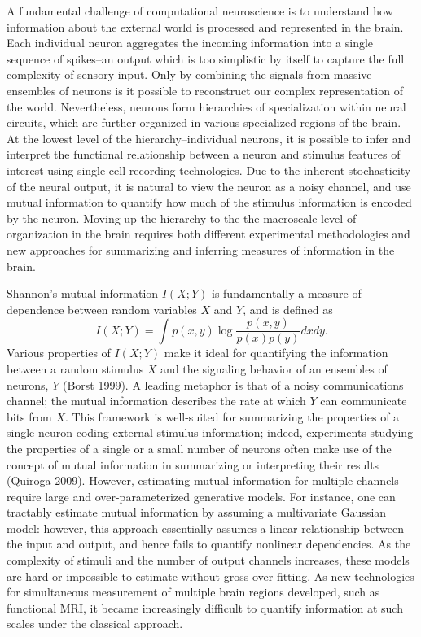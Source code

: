\documentclass[12pt]{article}
\begin{document}
A fundamental challenge of computational neuroscience is to understand
how information about the external world is processed and represented
in the brain. Each individual neuron aggregates the incoming
information into a single sequence of spikes--an output which is too
simplistic by itself to capture the full complexity of sensory
input. Only by combining the signals from massive ensembles of neurons
is it possible to reconstruct our complex representation of the
world. Nevertheless, neurons form hierarchies of specialization within
neural circuits, which are further organized in various specialized
regions of the brain.  At the lowest level of the hierarchy--individual neurons,
it is possible to infer and interpret the functional relationship between
a neuron and stimulus features of interest using single-cell recording technologies.
Due to the inherent stochasticity of the neural output, it is natural to
view the neuron as a noisy channel, and use mutual information
to quantify how much of the stimulus information is encoded by the neuron.
Moving up the hierarchy to the the macroscale level of organization in the
brain requires both different experimental methodologies and 
new approaches for summarizing and inferring measures of
information in the brain.

Shannon's mutual information $I(X; Y)$ is fundamentally a measure of
dependence between random variables $X$ and $Y$, and is defined as
\[
I(X;Y) = \int p(x, y) \log \frac{p(x, y)}{p(x)p(y)}dxdy.
\]
Various properties of $I(X; Y)$ make it ideal for quantifying the
information between a random stimulus $X$ and the signaling behavior
of an ensembles of neurons, $Y$ (Borst 1999).  A leading metaphor is
that of a noisy communications channel; the mutual information
describes the rate at which $Y$ can communicate bits from $X$.  This
framework is well-suited for summarizing the properties of a single
neuron coding external stimulus information; indeed, experiments
studying the properties of a single or a small number of neurons often
make use of the concept of mutual information in summarizing or
interpreting their results (Quiroga 2009). However, estimating mutual
information for multiple channels require large and over-parameterized
generative models.  For instance, one can tractably estimate mutual
information by assuming a multivariate Gaussian model: however, this
approach essentially assumes a linear relationship between the input
and output, and hence fails to quantify nonlinear dependencies.  As
the complexity of stimuli and the number of output channels increases,
these models are hard or impossible to estimate without gross
over-fitting.  As new technologies for simultaneous measurement of
multiple brain regions developed, such as functional MRI, it became
increasingly difficult to quantify information at such scales under
the classical approach.
 
\end{document}
